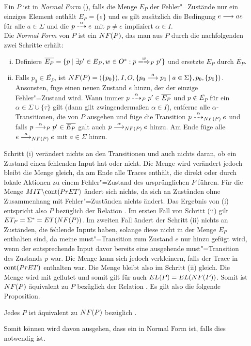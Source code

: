 \begin{Def}
  Ein \MEIO{} $P$ ist in \emph{Normal Form} (\NF{}), falls die Menge $E_P$ der
  Fehler"=Zustände nur ein einziges Element enthält $E_P=\{e\}$ und es gilt
  zusätzlich die Bedingung $e \must{a} e$ für alle $a\in\Sigma$ und die $p
  \may[\alpha] e$ mit $p\neq e$ impliziert $\alpha\in I$.\\
  Die \emph{Normal Form} von $P$ ist ein \MEIO{} $NF (P)$, das man aus $P$
  durch die nachfolgenden zwei Schritte erhält:
  \begin{enumerate}[(i)]
    \item Definiere $\overline{E_P} = \{p \mid \exists p'\in E_P, w\in O^*:
      p\weakmay[w]_P p'\}$ und ersetzte $E_P$ durch $\overline{E_P}$.
    \item Falls $p_0\in \overline{E_P}$, ist $NF(P) = (\{p_0\}), I, O, \{p_0
      \must[a] p_0 \mid a\in\Sigma\}, p_0, \{p_0\})$.\\
      Ansonsten, füge einen neuen Zustand $e$ hinzu, der der einzige
      Fehler"=Zustand wird. Wann immer $p \may[\alpha]_P p'\in \overline{E_P}$
      und $p\notin \overline{E_P}$ für ein $\alpha\in \Sigma \cup \{\tau\}$
      gilt (dann gilt zwingendermaßen $\alpha \in I$), entferne alle
      $\alpha$-Transitionen, die von $P$ ausgehen und füge die Transition
      $p\may[\alpha]_{\NF (P)} e$ und falls $p \must[\alpha]_P p'\in
      \overline{E_P}$ galt auch $p \must[\alpha]_{\NF (P)} e$ hinzu. Am Ende
      füge alle $e\must[a]_{\NF (P)} e$ mit $a\in\Sigma$ hinzu.
  \end{enumerate}
\end{Def}

Schritt (i) verändert nichts an den Transitionen und auch nichts daran, ob ein
Zustand einen fehlenden Input hat oder nicht. Die Menge \StET{} wird verändert
jedoch bleibt die Menge \PrET{} gleich, da \StET{} am Ende alle Traces enthält,
die direkt oder durch lokale Aktionen zu einem Fehler"=Zustand des
ursprünglichen $P$ führen. Für die Menge $MIT\backslash\mathrm{cont} (PrET)$ ändert
sich nichts, da sich an Zuständen ohne Zusammenhang mit Fehler"=Zuständen
nichts ändert. Das Ergebnis von (i) entspricht also $P$ bezüglich der Relation
\ERel{}. Im ersten Fall von Schritt (ii) gilt $ET _P =\Sigma ^* = ET (NF
(P))$. Im zweiten Fall ändert der Schritt (ii) nichts an Zuständen, die
fehlende Inputs haben, solange diese nicht in der Menge $\overline{E_P}$
enthalten sind, da meine must"=Transition zum Zustand $e$ nur hinzu gefügt
wird, wenn der entsprechende Input davor bereits eine ausgehende
must"=Transition des Zustands $p$ war. Die Menge \MIT{} kann sich jedoch
verkleinern, falls der Trace in $\mathrm{cont} (PrET)$ enthalten war. Die Menge \ET
bleibt also im Schritt (ii) gleich. Die Menge \EL wird mit \ET geflutet und
somit gilt für \EL auch $EL (P) = EL (NF (P))$. Somit ist $NF (P)$
äquivalent zu $P$ bezüglich der Relation \ERel{}. Es gilt also die folgende
Proposition.

\begin{Prop}
  Jedes \MEIO{} $P$ ist äquivalent zu $NF (P)$ bezüglich \ERel{}.
\end{Prop}

Somit können wird davon ausgehen, dass ein \MEIO{} in Normal Form ist, falls
dies notwendig ist.
